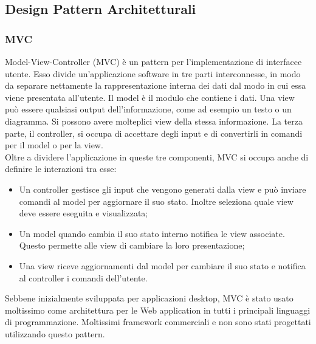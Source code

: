 \documentclass[12pt,a4paper]{article}
\begin{document}
\subsection{Design Pattern Architetturali}
\subsubsection{MVC}
Model-View-Controller (MVC) è un pattern per l’implementazione di interfacce utente. Esso divide un’applicazione software in tre parti interconnesse, in modo da separare nettamente la rappresentazione interna dei dati dal modo in cui essa viene presentata all’utente. Il model è il modulo che contiene i dati. Una view può essere qualsiasi output dell’informazione, come ad esempio un testo o un diagramma. Si possono avere molteplici view della stessa informazione. La terza parte, il controller, si occupa di accettare degli input e di convertirli in comandi per il model o per la view.\\
Oltre a dividere l’applicazione in queste tre componenti, MVC si occupa anche di definire le interazioni tra esse:
\begin{itemize}
	\item Un controller gestisce gli input che vengono generati dalla view e può inviare comandi al model per aggiornare il suo stato. Inoltre seleziona quale view deve essere eseguita e visualizzata;
	\item Un model quando cambia il suo stato interno notifica le view associate. Questo permette alle view di cambiare la loro presentazione;
	\item Una view riceve aggiornamenti dal model per cambiare il suo stato e notifica al controller i comandi dell'utente.
\end{itemize}
Sebbene inizialmente sviluppata per applicazioni desktop, MVC è stato usato moltissimo come architettura per le Web application in tutti i principali linguaggi di programmazione. Moltissimi framework commerciali e non sono stati progettati utilizzando questo pattern.
\end{document}

